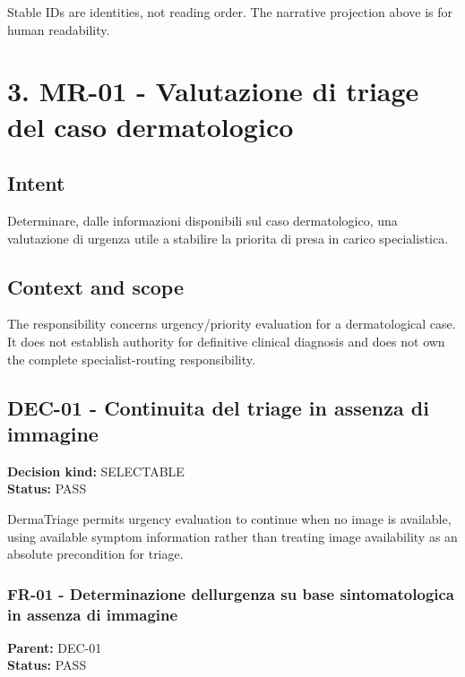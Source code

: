 \documentclass[11pt,a4paper]{article}
\begin{document}
Stable IDs are identities, not reading order. The narrative projection
above is for human readability.

\section{3. MR-01 - Valutazione di triage del caso
dermatologico}\label{3-mr-01---valutazione-di-triage-del-caso-dermatologico}

\subsection{Intent}\label{intent}

Determinare, dalle informazioni disponibili sul caso dermatologico, una
valutazione di urgenza utile a stabilire la priorita\textquotesingle{}
di presa in carico specialistica.

\subsection{Context and scope}\label{context-and-scope}

The responsibility concerns urgency/priority evaluation for a
dermatological case. It does not establish authority for definitive
clinical diagnosis and does not own the complete specialist-routing
responsibility.

\subsection{DEC-01 - Continuita\textquotesingle{} del triage in assenza
di
immagine}\label{dec-01---continuita-del-triage-in-assenza-di-immagine}

\textbf{Decision kind:} SELECTABLE\\
\textbf{Status:} PASS

DermaTriage permits urgency evaluation to continue when no image is
available, using available symptom information rather than treating
image availability as an absolute precondition for triage.

\subsubsection{FR-01 - Determinazione dell\textquotesingle urgenza su
base sintomatologica in assenza di
immagine}\label{fr-01---determinazione-dellurgenza-su-base-sintomatologica-in-assenza-di-immagine}

\textbf{Parent:} DEC-01\\
\textbf{Status:} PASS
\end{document}
